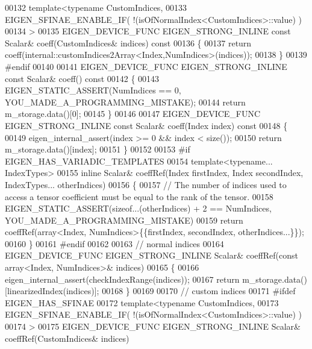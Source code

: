 \begin{DoxyCode}
00132     \textcolor{keyword}{template}<\textcolor{keyword}{typename} CustomIndices,
00133              EIGEN\_SFINAE\_ENABLE\_IF( !(isOfNormalIndex<CustomIndices>::value) )
00134     >
00135     EIGEN\_DEVICE\_FUNC EIGEN\_STRONG\_INLINE \textcolor{keyword}{const} Scalar& coeff(CustomIndices& indices)\textcolor{keyword}{ const}
00136 \textcolor{keyword}{    }\{
00137         \textcolor{keywordflow}{return} coeff(internal::customIndices2Array<Index,NumIndices>(indices));
00138     \}
00139 \textcolor{preprocessor}{#endif}
00140 
00141     EIGEN\_DEVICE\_FUNC EIGEN\_STRONG\_INLINE \textcolor{keyword}{const} Scalar& coeff()\textcolor{keyword}{ const}
00142 \textcolor{keyword}{    }\{
00143       EIGEN\_STATIC\_ASSERT(NumIndices == 0, YOU\_MADE\_A\_PROGRAMMING\_MISTAKE);
00144       \textcolor{keywordflow}{return} m\_storage.data()[0];
00145     \}
00146 
00147     EIGEN\_DEVICE\_FUNC EIGEN\_STRONG\_INLINE \textcolor{keyword}{const} Scalar& coeff(Index index)\textcolor{keyword}{ const}
00148 \textcolor{keyword}{    }\{
00149       eigen\_internal\_assert(index >= 0 && index < size());
00150       \textcolor{keywordflow}{return} m\_storage.data()[index];
00151     \}
00152 
00153 \textcolor{preprocessor}{#if EIGEN\_HAS\_VARIADIC\_TEMPLATES}
00154     \textcolor{keyword}{template}<\textcolor{keyword}{typename}... IndexTypes>
00155     \textcolor{keyword}{inline} Scalar& coeffRef(Index firstIndex, Index secondIndex, IndexTypes... otherIndices)
00156     \{
00157       \textcolor{comment}{// The number of indices used to access a tensor coefficient must be equal to the rank of the tensor.}
00158       EIGEN\_STATIC\_ASSERT(\textcolor{keyword}{sizeof}...(otherIndices) + 2 == NumIndices, YOU\_MADE\_A\_PROGRAMMING\_MISTAKE)
00159       \textcolor{keywordflow}{return} coeffRef(array<Index, NumIndices>\{\{firstIndex, secondIndex, otherIndices...\}\});
00160     \}
00161 \textcolor{preprocessor}{#endif}
00162 
00163     \textcolor{comment}{// normal indices}
00164     EIGEN\_DEVICE\_FUNC EIGEN\_STRONG\_INLINE Scalar& coeffRef(\textcolor{keyword}{const} array<Index, NumIndices>& indices)
00165     \{
00166       eigen\_internal\_assert(checkIndexRange(indices));
00167       \textcolor{keywordflow}{return} m\_storage.data()[linearizedIndex(indices)];
00168     \}
00169 
00170     \textcolor{comment}{// custom indices}
00171 \textcolor{preprocessor}{#ifdef EIGEN\_HAS\_SFINAE}
00172     \textcolor{keyword}{template}<\textcolor{keyword}{typename} CustomIndices,
00173              EIGEN\_SFINAE\_ENABLE\_IF( !(isOfNormalIndex<CustomIndices>::value) )
00174              >
00175     EIGEN\_DEVICE\_FUNC EIGEN\_STRONG\_INLINE Scalar& coeffRef(CustomIndices& indices)

\end{DoxyCode}
